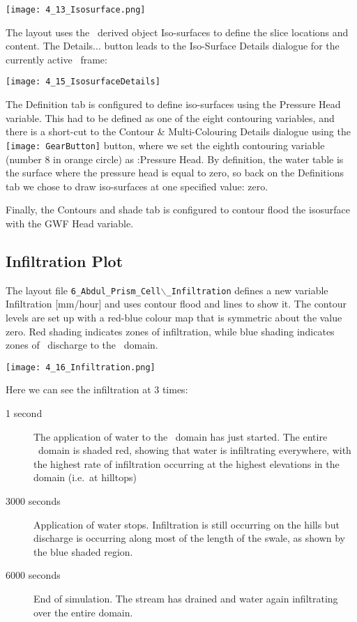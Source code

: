         \texttt{[image: 4\_13\_Isosurface.png]}

The layout uses the \tecplot\ derived object {\sf Iso-surfaces} to define the slice locations and content. The {\sf Details...} button leads to the {\sf Iso-Surface Details} dialogue for the currently active \gwf\ frame:

        \texttt{[image: 4\_15\_IsosurfaceDetails]}

The {\sf Definition} tab is configured to define iso-surfaces using the {\sf Pressure Head} variable. This had to be defined as one of the eight contouring variables, and there is a short-cut to the {\sf Contour \& Multi-Colouring Details} dialogue using the \texttt{[image: GearButton]} button, where we set the eighth contouring variable (number 8 in orange circle) as {:Pressure Head}.  By definition, the water table is the surface where the pressure head is equal to zero, so back on the {\sf Definitions} tab we chose to draw iso-surfaces at one specified value: zero.

Finally, the {\sf Contours and shade} tab is configured to contour flood the isosurface with the {\sf GWF Head} variable.

\subsection{Infiltration Plot}
The layout file {\tt 6\_Abdul\_Prism\_Cell$\backslash$\_Infiltration} defines a new variable {\sf Infiltration [mm/hour]} and uses contour flood and lines to show it.  The contour levels are set up with a red-blue colour map that is symmetric about the value zero. Red shading indicates zones of infiltration, while blue shading indicates zones of \gwf\ discharge to the \swf\ domain.

        \texttt{[image: 4\_16\_Infiltration.png]}

Here we can see the infiltration at 3 times:
\begin{description}
\item [1 second] The application of water to the \swf\ domain has just started.  The entire \swf\ domain is shaded red, showing that water is infiltrating everywhere, with the highest rate of infiltration occurring at the highest elevations in the domain (i.e.\ at hilltops)
\item [3000 seconds] Application of water stops.  Infiltration is still occurring on the hills but discharge is occurring along most of the length of the swale, as shown by the blue shaded region.
\item [6000 seconds] End of simulation.  The stream has drained and water again infiltrating over the entire  domain.
\end{description}

